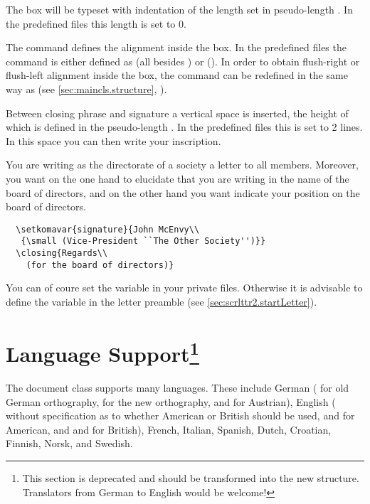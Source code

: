 The box will be typeset with indentation of the length set in
pseudo-length . In the predefined  files
this length is set to 0.

The command  defines the alignment inside the
box. In the predefined  files the command is either defined
as  (all besides ) or
 ().  In order to obtain
flush-right or flush-left alignment inside the box, the command can be
redefined in the same way as  (see
\autoref{sec:maincls.structure},
).

Between closing phrase and signature a vertical space is inserted, the
height of which is defined in the pseudo-length
. In the predefined  files this is
set to 2 lines.  In this space you can then write your inscription.
\begin{Example}
  You are writing as the directorate of a society a letter to all
  members.  Moreover, you want on the one hand to elucidate that you
  are writing in the name of the board of directors, and on the other
  hand you want indicate your position on the board of directors.
\begin{lstlisting}
  \setkomavar{signature}{John McEnvy\\
   {\small (Vice-President ``The Other Society'')}}
  \closing{Regards\\
    (for the board of directors)}
\end{lstlisting}
You can of coure set the variable  in your private
 files.  Otherwise it is advisable to define the variable in
the letter preamble (see \autoref{sec:scrlttr2.startLetter}).
\end{Example}
%
%
%
%


\section{Language Support\protect\footnote{This section is
  deprecated and should be transformed into the new structure. Translators
  from German to English would be welcome!}}
\label{sec:scrlttr2.languages}
%

The document class  supports many languages.  These
include German ( for old German orthography,
 for the new orthography, and  for
Austrian), English ( without specification as to
whether American or British should be used,  and
 for American, and  and
 for British), French, Italian, Spanish, Dutch,
Croatian, Finnish, Norsk, and
Swedish.

